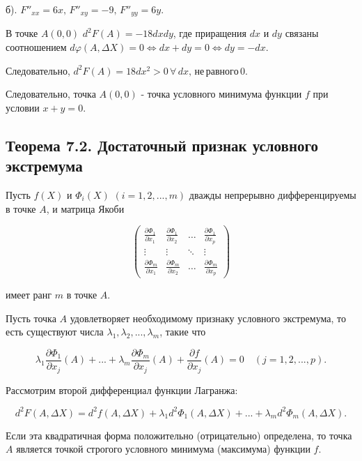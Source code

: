 {б). \( F''_{xx} = 6x, \, F''_{xy} = -9, \, F''_{yy} = 6y \).

В точке \( A(0,0) \) \( d^2F(A) = -18dxdy \), где приращения \( dx \) и \( dy \) связаны соотношением \( d\varphi(A, \Delta X) = 0 \Leftrightarrow dx + dy = 0 \Leftrightarrow dy = -dx \).

Следовательно, \( d^2F(A) = 18dx^2 > 0 \, \forall \, dx, \, не \, равного \, 0 \).

Следовательно, точка \( A(0,0) \) - точка условного минимума функции \( f \) при условии \( x + y = 0 \).

\subsection*{Теорема 7.2. Достаточный признак условного экстремума}

Пусть \( f(X) \) и \( \Phi_i(X) \) \( (i=1,2,...,m) \) дважды непрерывно дифференцируемы в точке \( A \), и матрица Якоби



\[
\begin{pmatrix}
\frac{\partial \Phi_1}{\partial x_1} & \frac{\partial \Phi_1}{\partial x_2} & \ldots & \frac{\partial \Phi_1}{\partial x_p} \\
\vdots & \vdots & \ddots & \vdots \\
\frac{\partial \Phi_m}{\partial x_1} & \frac{\partial \Phi_m}{\partial x_2} & \ldots & \frac{\partial \Phi_m}{\partial x_p}
\end{pmatrix}
\]



имеет ранг \( m \) в точке \( A \).

Пусть точка \( A \) удовлетворяет необходимому признаку условного экстремума, то есть существуют числа \( \lambda_1, \lambda_2, ..., \lambda_m \), такие что



\[
\lambda_1 \frac{\partial \Phi_1}{\partial x_j}(A) + ... + \lambda_m \frac{\partial \Phi_m}{\partial x_j}(A) + \frac{\partial f}{\partial x_j}(A) = 0 \quad (j=1,2,...,p).
\]



Рассмотрим второй дифференциал функции Лагранжа:



\[
d^2F(A, \Delta X) = d^2f(A, \Delta X) + \lambda_1 d^2\Phi_1(A, \Delta X) + ... + \lambda_m d^2\Phi_m(A, \Delta X).
\]



Если эта квадратичная форма положительно (отрицательно) определена, то точка \( A \) является точкой строгого условного минимума (максимума) функции \( f \).


}